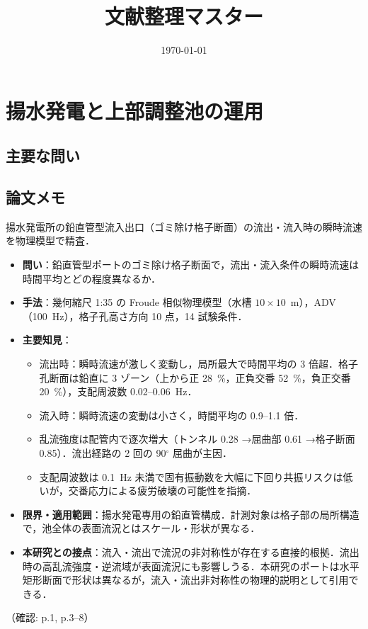 \documentclass[11pt]{jsarticle}
\title{文献整理マスター}
\author{}
\date{\today}
\let\litsectionorig\section
\renewcommand{\section}{\clearpage\litsectionorig}
\newcommand{\litref}[1]{{\large\bfseries\color{citecolor}#1}}
\begin{document}
\maketitle

\section{揚水発電と上部調整池の運用}

\subsection*{主要な問い}

\subsection*{論文メモ}

\noindent\litref{Zhu et al. (2023)}\quad 揚水発電所の鉛直管型流入出口（ゴミ除け格子断面）の流出・流入時の瞬時流速を物理模型で精査．
\begin{itemize}
  \item \textbf{問い}：鉛直管型ポートのゴミ除け格子断面で，流出・流入条件の瞬時流速は時間平均とどの程度異なるか．
  \item \textbf{手法}：幾何縮尺 1:35 の Froude 相似物理模型（水槽 $10 \times 10$~m），ADV（100~Hz），格子孔高さ方向 10 点，14 試験条件．
  \item \textbf{主要知見}：
  \begin{itemize}
    \item 流出時：瞬時流速が激しく変動し，局所最大で時間平均の 3 倍超．格子孔断面は鉛直に 3 ゾーン（上から正 28~\%，正負交番 52~\%，負正交番 20~\%），支配周波数 0.02--0.06~Hz．
    \item 流入時：瞬時流速の変動は小さく，時間平均の 0.9--1.1 倍．
    \item 乱流強度は配管内で逐次増大（トンネル 0.28 →屈曲部 0.61 →格子断面 0.85）．流出経路の 2 回の 90$^\circ$ 屈曲が主因．
    \item 支配周波数は 0.1~Hz 未満で固有振動数を大幅に下回り共振リスクは低いが，交番応力による疲労破壊の可能性を指摘．
  \end{itemize}
  \item \textbf{限界・適用範囲}：揚水発電専用の鉛直管構成．計測対象は格子部の局所構造で，池全体の表面流況とはスケール・形状が異なる．
  \item \textbf{本研究との接点}：流入・流出で流況の非対称性が存在する直接的根拠．流出時の高乱流強度・逆流域が表面流況にも影響しうる．本研究のポートは水平矩形断面で形状は異なるが，流入・流出非対称性の物理的説明として引用できる．
\end{itemize}
\noindent（確認: p.1, p.3--8）
\end{document}
